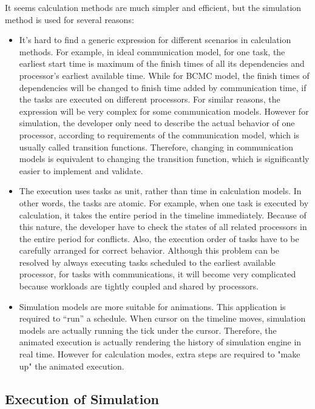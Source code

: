 \documentclass[msc,deptreport, cs]{infthesis}
\begin{document}
It seems calculation methods are much simpler and efficient, but the simulation method is used for several reasons:

\begin{itemize}
  \item It's hard to find a generic expression for different scenarios in calculation methods. For example, in ideal communication model, for one task, the earliest start time is maximum of the finish times of all its dependencies and processor's earliest available time. While for BCMC model, the finish times of dependencies will be changed to finish time added by communication time, if the tasks are executed on different processors. For similar reasons, the expression will be very complex for some communication models. However for simulation, the developer only need to describe the actual behavior of one processor, according to requirements of the communication model, which is usually called transition functions. Therefore, changing in communication models is equivalent to changing the transition function, which is significantly easier to implement and validate.
  \item The execution uses tasks as unit, rather than time in calculation models. In other words, the tasks are atomic. For example, when one task is executed by calculation, it takes the entire period in the timeline immediately. Because of this nature, the developer have to check the states of all related processors in the entire period for conflicts. Also, the execution order of tasks have to be carefully arranged for correct behavior. Although this problem can be resolved by always executing tasks scheduled to the earliest available processor, for tasks with communications, it will become very complicated because workloads are tightly coupled and shared by processors.
  \item Simulation models are more suitable for animations. This application is required to ``run'' a schedule. When cursor on the timeline moves, simulation models are actually running the tick under the cursor. Therefore, the animated execution is actually rendering the history of simulation engine in real time. However for calculation modes, extra steps are required to "make up" the animated execution.
\end{itemize}

\subsection{Execution of Simulation}
\end{document}
